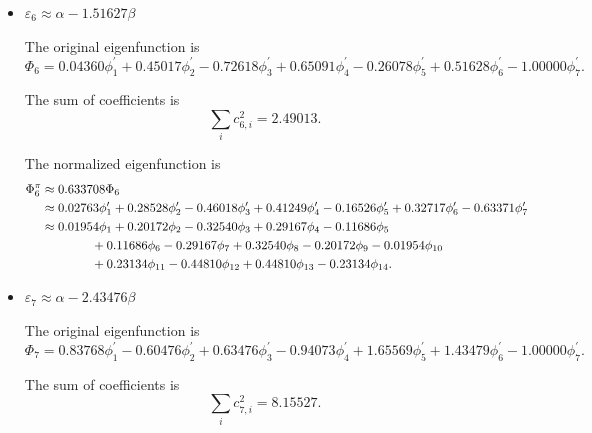 \documentclass[a4paper]{book}
\begin{document}
\begin{solution}
\begin{enumerate}[label=(\alph*)]
\begin{itemize}
		
		\item $\varepsilon_6 \approx \alpha -1.51627 \beta$
		
		The original eigenfunction is
		\begin{equation*}
			\Phi_6 = 0.04360 \phi^\prime_1 + 0.45017 \phi^\prime_2 -0.72618 \phi^\prime_3 +0.65091 \phi^\prime_4 -0.26078 \phi^\prime_5 + 0.51628 \phi^\prime_6 - 1.00000 \phi^\prime_7.
		\end{equation*}
		
		The sum of coefficients is
		\begin{equation*}
			\sum_{i} c^2_{6,i} = 2.49013.
		\end{equation*}
		
		The normalized eigenfunction is
		\begin{align}
			\Phi^\pi_6 &\approx 0.633708 \Phi_6 \notag \\
			&\approx 0.02763 \phi^\prime_1 + 0.28528 \phi^\prime_2 -0.46018 \phi^\prime_3 + 0.41249 \phi^\prime_4 - 0.16526 \phi^\prime_5 + 0.32717 \phi^\prime_6 - 0.63371 \phi^\prime_7 \notag \\
			&\approx 0.01954 \phi_1 +0.20172 \phi_2 - 0.32540 \phi_3 +0.29167 \phi_4 -0.11686 \phi_5  \notag \\
			&\hspace*{4em} +0.11686 \phi_6 -0.29167 \phi_7 + 0.32540\phi_8 -0.20172 \phi_9 - 0.01954 \phi_{10} \notag \\
			&\hspace*{4em} + 0.23134 \phi_{11} -0.44810 \phi_{12} +0.44810 \phi_{13} - 0.23134  \phi_{14} .
		\end{align}
		
		
		\item $\varepsilon_7 \approx \alpha -2.43476 \beta$
		
		The original eigenfunction is
		\begin{equation*}
			\Phi_7 = 0.83768 \phi^\prime_1 - 0.60476 \phi^\prime_2 +0.63476 \phi^\prime_3 - 0.94073 \phi^\prime_4 + 1.65569 \phi^\prime_5 + 1.43479 \phi^\prime_6 - 1.00000 \phi^\prime_7.
		\end{equation*}
		
		The sum of coefficients is
		\begin{equation*}
			\sum_{i} c^2_{7,i} = 8.15527.
		\end{equation*}
		

\end{itemize}
\end{enumerate}
\end{solution}
\end{document}
